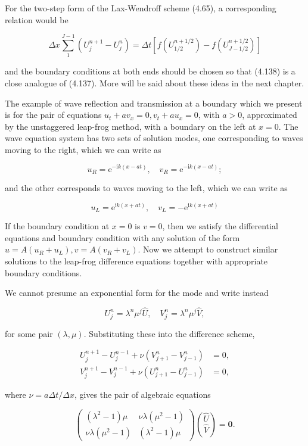\documentclass[10pt]{article}
\begin{document}
For the two-step form of the Lax-Wendroff scheme (4.65), a corresponding relation would be

\[
\Delta x \sum_{1}^{J-1}\left(U_{j}^{n+1}-U_{j}^{n}\right)=\Delta t\left[f\left(U_{1 / 2}^{n+1 / 2}\right)-f\left(U_{J-1 / 2}^{n+1 / 2}\right)\right]
\]

and the boundary conditions at both ends should be chosen so that (4.138) is a close analogue of (4.137). More will be said about these ideas in the next chapter.

The example of wave reflection and transmission at a boundary which we present is for the pair of equations \(u_{t}+a v_{x}=0, v_{t}+a u_{x}=0\), with \(a>0\), approximated by the unstaggered leap-frog method, with a boundary on the left at \(x=0\). The wave equation system has two sets of solution modes, one corresponding to waves moving to the right, which we can write as

\[
u_{R}=\mathrm{e}^{-\mathrm{i} k(x-a t)}, \quad v_{R}=\mathrm{e}^{-\mathrm{i} k(x-a t)} ;
\]

and the other corresponds to waves moving to the left, which we can write as

\[
u_{L}=\mathrm{e}^{\mathrm{i} k(x+a t)}, \quad v_{L}=-\mathrm{e}^{\mathrm{i} k(x+a t)}
\]

If the boundary condition at \(x=0\) is \(v=0\), then we satisfy the differential equations and boundary condition with any solution of the form \(u=A\left(u_{R}+u_{L}\right), v=A\left(v_{R}+v_{L}\right)\). Now we attempt to construct similar\\
solutions to the leap-frog difference equations together with appropriate boundary conditions.

We cannot presume an exponential form for the mode and write instead

\[
U_{j}^{n}=\lambda^{n} \mu^{j} \widehat{U}, \quad V_{j}^{n}=\lambda^{n} \mu^{j} \widehat{V},
\]

for some pair \((\lambda, \mu)\). Substituting these into the difference scheme,

\[
\begin{aligned}
U_{j}^{n+1}-U_{j}^{n-1}+\nu\left(V_{j+1}^{n}-V_{j-1}^{n}\right) & =0, \\
V_{j}^{n+1}-V_{j}^{n-1}+\nu\left(U_{j+1}^{n}-U_{j-1}^{n}\right) & =0,
\end{aligned}
\]

where \(\nu=a \Delta t / \Delta x\), gives the pair of algebraic equations

\[
\left(\begin{array}{ll}
\left(\lambda^{2}-1\right) \mu & \nu \lambda\left(\mu^{2}-1\right) \\
\nu \lambda\left(\mu^{2}-1\right) & \left(\lambda^{2}-1\right) \mu
\end{array}\right)\binom{\widehat{U}}{\widehat{V}}=\mathbf{0} .
\]
\end{document}
